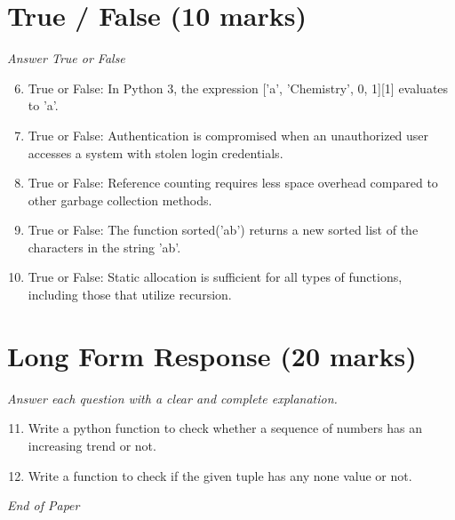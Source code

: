 \documentclass[12pt]{article}
\begin{document}
\section*{True / False (10 marks)}
\textit{Answer True or False}
\begin{enumerate}[label=\arabic*.]
\setcounter{enumi}{5}
\item True or False: In Python 3, the expression ['a', 'Chemistry', 0, 1][1] evaluates to 'a'.
\item True or False: Authentication is compromised when an unauthorized user accesses a system with stolen login credentials.
\item True or False: Reference counting requires less space overhead compared to other garbage collection methods.
\item True or False: The function sorted('ab') returns a new sorted list of the characters in the string 'ab'.
\item True or False: Static allocation is sufficient for all types of functions, including those that utilize recursion.
\end{enumerate}

\section*{Long Form Response (20 marks)}
\textit{Answer each question with a clear and complete explanation.}
\begin{enumerate}[label=\arabic*.]
\setcounter{enumi}{10}
\item Write a python function to check whether a sequence of numbers has an increasing trend or not.
\item Write a function to check if the given tuple has any none value or not.
\end{enumerate}

\vfill
\noindent\textit{End of Paper}
\end{document}
